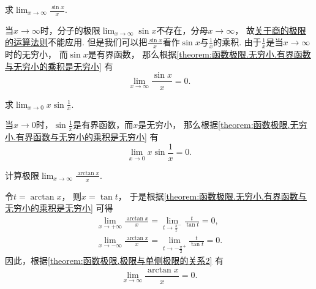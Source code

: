\begin{example}
求\(\lim_{x\to\infty} \frac{\sin x}{x}\).
\begin{solution}
当\(x\to\infty\)时，分子的极限\(\lim_{x\to\infty} \sin x\)不存在，分母\(x\to\infty\)，
故\hyperref[theorem:极限.极限的四则运算法则]{关于商的极限的运算法则}不能应用.
但是我们可以把\(\frac{\sin x}{x}\)看作\(\sin x\)与\(\frac1x\)的乘积.
由于\(\frac1x\)是当\(x\to\infty\)时的无穷小，
而\(\sin x\)是有界函数，
那么根据\cref{theorem:函数极限.无穷小.有界函数与无穷小的乘积是无穷小}
有\begin{equation}
	\lim_{x\to\infty} \frac{\sin x}{x} = 0.
\end{equation}
\end{solution}
\end{example}

\begin{example}
求\(\lim_{x\to0} x \sin\frac1x\).
\begin{solution}
当\(x\to0\)时，\(\sin\frac1x\)是有界函数，而\(x\)是无穷小，
那么根据\cref{theorem:函数极限.无穷小.有界函数与无穷小的乘积是无穷小}
有\begin{equation}
	\lim_{x\to0} x \sin\frac1x = 0.
\end{equation}
\end{solution}
\end{example}

\begin{example}
计算极限\(\lim_{x\to\infty} \frac{\arctan x}{x}\).
\begin{solution}
令\(t = \arctan x\)，
则\(x = \tan t\)，
于是根据\cref{theorem:函数极限.无穷小.有界函数与无穷小的乘积是无穷小} 可得\begin{gather*}
	\lim_{x\to+\infty} \frac{\arctan x}{x}
	= \lim_{t\to\frac\pi2^-} \frac{t}{\tan t}
	= 0, \\
	\lim_{x\to-\infty} \frac{\arctan x}{x}
	= \lim_{t\to-\frac\pi2^+} \frac{t}{\tan t}
	= 0.
\end{gather*}
因此，根据\cref{theorem:函数极限.极限与单侧极限的关系2} 有\begin{equation}
	\lim_{x\to\infty} \frac{\arctan x}{x} = 0.
\end{equation}
\end{solution}
\end{example}

